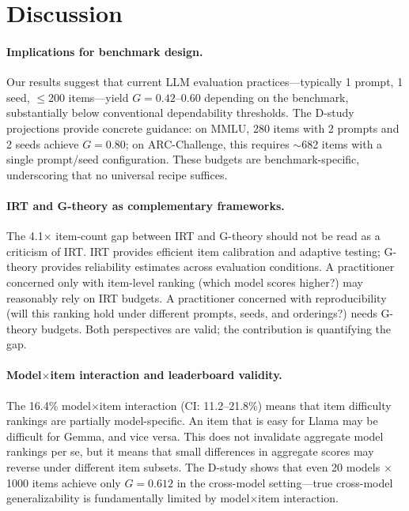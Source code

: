 \documentclass[11pt,letterpaper]{article}
\begin{document}
\section{Discussion}

\paragraph{Implications for benchmark design.}
Our results suggest that current LLM evaluation practices---typically 1 prompt, 1 seed, $\leq$200 items---yield $G = 0.42$--$0.60$ depending on the benchmark, substantially below conventional dependability thresholds.
The D-study projections provide concrete guidance: on MMLU, 280 items with 2 prompts and 2 seeds achieve $G = 0.80$; on ARC-Challenge, this requires $\sim$682 items with a single prompt/seed configuration.
These budgets are benchmark-specific, underscoring that no universal recipe suffices.

\paragraph{IRT and G-theory as complementary frameworks.}
The 4.1$\times$ item-count gap between IRT and G-theory should not be read as a criticism of IRT.
IRT provides efficient item calibration and adaptive testing; G-theory provides reliability estimates across evaluation conditions.
A practitioner concerned only with item-level ranking (which model scores higher?) may reasonably rely on IRT budgets.
A practitioner concerned with reproducibility (will this ranking hold under different prompts, seeds, and orderings?) needs G-theory budgets.
Both perspectives are valid; the contribution is quantifying the gap.

\paragraph{Model$\times$item interaction and leaderboard validity.}
The 16.4\% model$\times$item interaction (CI: 11.2--21.8\%) means that item difficulty rankings are partially model-specific.
An item that is easy for Llama may be difficult for Gemma, and vice versa.
This does not invalidate aggregate model rankings per se, but it means that small differences in aggregate scores may reverse under different item subsets.
The D-study shows that even 20 models $\times$ 1000 items achieve only $G = 0.612$ in the cross-model setting---true cross-model generalizability is fundamentally limited by model$\times$item interaction.
\end{document}
